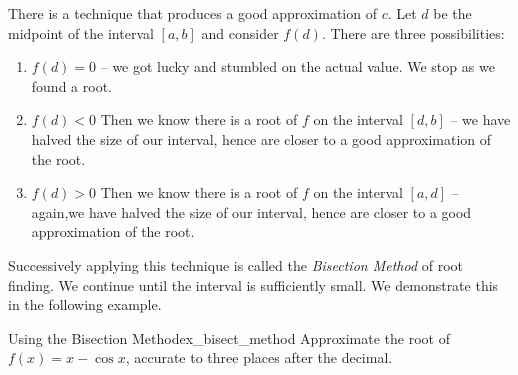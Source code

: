 There is a technique that produces a good approximation of $c$. Let $d$ be the midpoint of the interval $[a,b]$ and consider $f(d)$. There are three possibilities:
	\begin{enumerate} 
	\item		$f(d) = 0$ -- we got lucky and stumbled on the actual value. We stop as we found a root.
	\item		$f(d) <0$ Then we know there is a root of $f$ on the interval $[d,b]$ -- we have halved the size of our interval, hence are closer to a good approximation of the root.
	\item		$f(d) >0$ Then we know there is a root of $f$ on the interval $[a,d]$ -- again,we have halved the size of our interval, hence are closer to a good approximation of the root.
	\end{enumerate}

\enlargethispage{2\baselineskip}	
Successively applying this technique is called the \textit{Bisection Method}  of root finding. We continue until the interval is sufficiently small. We demonstrate this in the following example.\\

\begin{example}{Using the Bisection Method}{ex_bisect_method}{
Approximate the root of $f(x) = x-\cos x$, accurate to three places after the decimal.}
\end{example}


